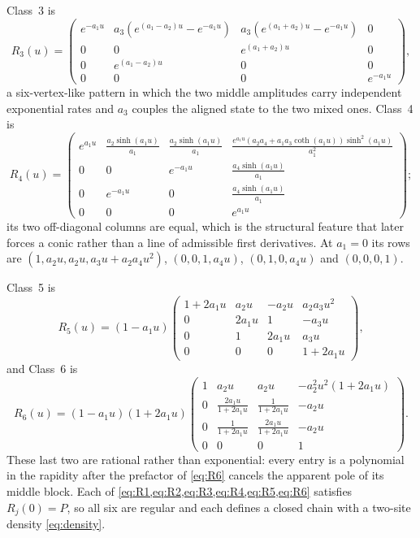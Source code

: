 \documentclass[11pt,reqno]{amsart}
\theoremstyle{plain}
\theoremstyle{definition}
\theoremstyle{remark}
\numberwithin{equation}{section}
\begin{document}
Class~3 is
\begin{equation}
R_3(u)=\begin{pmatrix}
e^{-a_1u}&a_3(e^{(a_1-a_2)u}-e^{-a_1u})&
a_3(e^{(a_1+a_2)u}-e^{-a_1u})&0\\
0&0&e^{(a_1+a_2)u}&0\\
0&e^{(a_1-a_2)u}&0&0\\
0&0&0&e^{-a_1u}
\end{pmatrix},                                      \label{eq:R3}
\end{equation}
a six-vertex-like pattern in which the two middle amplitudes carry independent
exponential rates and $a_3$ couples the aligned state to the two mixed ones.
Class~4 is
\begin{equation}
R_4(u)=\begin{pmatrix}
e^{a_1u}&\frac{a_2\sinh(a_1u)}{a_1}&
\frac{a_2\sinh(a_1u)}{a_1}&
\frac{e^{a_1u}(a_2a_4+a_1a_3\coth(a_1u))\sinh^2(a_1u)}{a_1^2}\\
0&0&e^{-a_1u}&\frac{a_4\sinh(a_1u)}{a_1}\\
0&e^{-a_1u}&0&\frac{a_4\sinh(a_1u)}{a_1}\\
0&0&0&e^{a_1u}
\end{pmatrix};                                      \label{eq:R4}
\end{equation}
its two off-diagonal columns are equal, which is the structural feature that
later forces a conic rather than a line of admissible first derivatives. At
$a_1=0$ its rows are $(1,a_2u,a_2u,a_3u+a_2a_4u^2)$, $(0,0,1,a_4u)$,
$(0,1,0,a_4u)$ and $(0,0,0,1)$.

Class~5 is
\begin{equation}
R_5(u)=(1-a_1u)\begin{pmatrix}
1+2a_1u&a_2u&-a_2u&a_2a_3u^2\\
0&2a_1u&1&-a_3u\\0&1&2a_1u&a_3u\\0&0&0&1+2a_1u
\end{pmatrix},                                      \label{eq:R5}
\end{equation}
and Class~6 is
\begin{equation}
R_6(u)=(1-a_1u)(1+2a_1u)\begin{pmatrix}
1&a_2u&a_2u&-a_2^2u^2(1+2a_1u)\\
0&\frac{2a_1u}{1+2a_1u}&\frac1{1+2a_1u}&-a_2u\\
0&\frac1{1+2a_1u}&\frac{2a_1u}{1+2a_1u}&-a_2u\\
0&0&0&1
\end{pmatrix}.                                      \label{eq:R6}
\end{equation}
These last two are rational rather than exponential: every entry is a polynomial
in the rapidity after the prefactor of \cref{eq:R6} cancels the apparent pole of
its middle block. Each of \cref{eq:R1,eq:R2,eq:R3,eq:R4,eq:R5,eq:R6} satisfies
$R_j(0)=P$, so all six are regular and each defines a closed chain with a
two-site density \cref{eq:density}.
\end{document}

